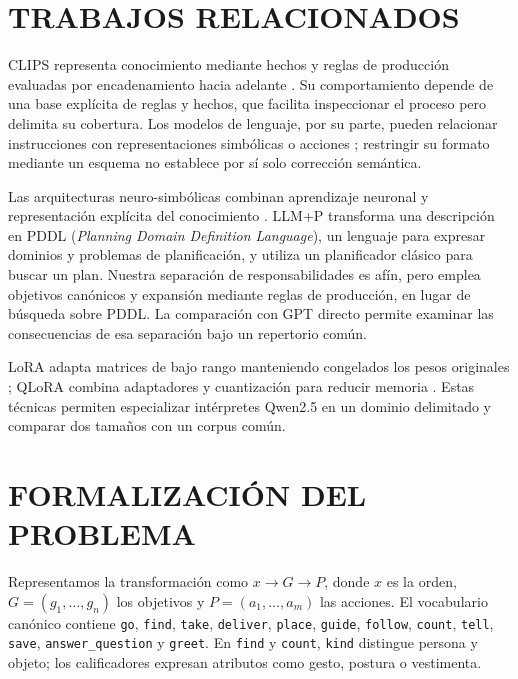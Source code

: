 \documentclass[a4paper,twoside]{article}
\begin{document}
\section{TRABAJOS RELACIONADOS}
CLIPS representa conocimiento mediante hechos y reglas de producción evaluadas por encadenamiento hacia adelante \cite{NASA_CLIPS,Giarratano2005}. Su comportamiento depende de una base explícita de reglas y hechos, que facilita inspeccionar el proceso pero delimita su cobertura. Los modelos de lenguaje, por su parte, pueden relacionar instrucciones con representaciones simbólicas o acciones \cite{Shi2023}; restringir su formato mediante un esquema no establece por sí solo corrección semántica.

Las arquitecturas neuro-simbólicas combinan aprendizaje neuronal y representación explícita del conocimiento \cite{garcez2015neural,besold2017neural}. LLM+P \cite{liu2023llmp} transforma una descripción en PDDL (\emph{Planning Domain Definition Language}), un lenguaje para expresar dominios y problemas de planificación, y utiliza un planificador clásico para buscar un plan. Nuestra separación de responsabilidades es afín, pero emplea objetivos canónicos y expansión mediante reglas de producción, en lugar de búsqueda sobre PDDL. La comparación con GPT directo permite examinar las consecuencias de esa separación bajo un repertorio común.

LoRA adapta matrices de bajo rango manteniendo congelados los pesos originales \cite{hu2022lora}; QLoRA combina adaptadores y cuantización para reducir memoria \cite{dettmers2023qlora}. Estas técnicas permiten especializar intérpretes Qwen2.5 \cite{yang2024qwen25} en un dominio delimitado y comparar dos tamaños con un corpus común.



\section{FORMALIZACIÓN DEL PROBLEMA}
Representamos la transformación como $x\rightarrow G\rightarrow P$, donde $x$ es la orden, $G=(g_1,\ldots,g_n)$ los objetivos y $P=(a_1,\ldots,a_m)$ las acciones. El vocabulario canónico contiene \texttt{go}, \texttt{find}, \texttt{take}, \texttt{deliver}, \texttt{place}, \texttt{guide}, \texttt{follow}, \texttt{count}, \texttt{tell}, \texttt{save}, \texttt{answer\_question} y \texttt{greet}. En \texttt{find} y \texttt{count}, \texttt{kind} distingue persona y objeto; los calificadores expresan atributos como gesto, postura o vestimenta.
\end{document}
